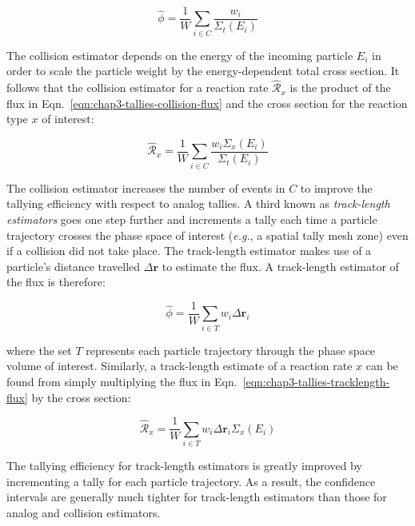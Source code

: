 \begin{dmath}
\label{eqn:chap3-tallies-collision-flux}
\hat{\phi} = \frac{1}{W}\displaystyle\sum\limits_{i \in C}\frac{w_{i}}{\Sigma_{t}(E_{i})}
\end{dmath}

\noindent The collision estimator depends on the energy of the incoming particle $E_{i}$ in order to scale the particle weight by the energy-dependent total cross section. It follows that the collision estimator for a reaction rate $\hat{\mathcal{R}}_{x}$ is the product of the flux in Eqn.~\ref{eqn:chap3-tallies-collision-flux} and the cross section for the reaction type $x$ of interest:

\begin{dmath}
\label{eqn:chap3-tallies-collision-rxn}
\hat{\mathcal{R}}_{x} = \frac{1}{W}\displaystyle\sum\limits_{i \in C}\frac{w_{i}\Sigma_{x}(E_{i})}{\Sigma_{t}(E_{i})}
\end{dmath}

The collision estimator increases the number of events in $C$ to improve the tallying efficiency with respect to analog tallies. A third known as \textit{track-length estimators} goes one step further and increments a tally each time a particle trajectory crosses the phase space of interest (\textit{e.g.}, a spatial tally mesh zone) even if a collision did not take place. The track-length estimator makes use of a particle's distance travelled $\Delta\mathbf{r}$ to estimate the flux. A track-length estimator of the flux is therefore:

\begin{dmath}
\label{eqn:chap3-tallies-tracklength-flux}
  \hat{\phi} = \frac{1}{W}\displaystyle\sum\limits_{i \in T}w_{i}\Delta\mathbf{r}_{i}
\end{dmath}

\noindent where the set $T$ represents each particle trajectory through the phase space volume of interest. Similarly, a track-length estimate of a reaction rate $x$ can be found from simply multiplying the flux in Eqn.~\ref{eqn:chap3-tallies-tracklength-flux} by the cross section:

\begin{dmath}
\label{eqn:chap3-tallies-tracklength-rxn}
  \hat{\mathcal{R}}_{x} = \frac{1}{W}\displaystyle\sum\limits_{i \in T}w_{i}\Delta\mathbf{r}_{i}\Sigma_{x}(E_{i})
\end{dmath}

The tallying efficiency for track-length estimators is greatly improved by incrementing a tally for each particle trajectory. As a result, the confidence intervals are generally much tighter for track-length estimators than those for analog and collision estimators. 

